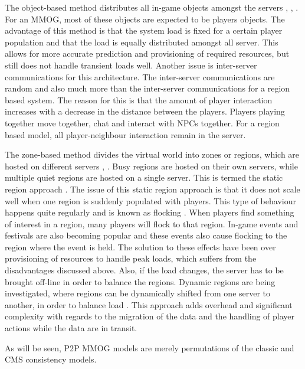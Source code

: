 \documentclass[journal,oneside,a4paper,onecolumn]{IEEEtran}
\begin{document}
The object-based method distributes all in-game objects amongst the servers \cite{object_based_consistency1}, \cite{object_based_consistency2}, \cite{object_based_consistency3}. For an MMOG, most of these objects are expected to be players objects. The advantage of this method is that the system load is fixed for a certain player population and that the load is equally distributed amongst all server. This allows for more accurate prediction and provisioning  of required resources, but still does not handle transient loads well. Another issue is inter-server communications for this architecture. The inter-server communications are random and also much more than the inter-server communications for a region based system. The reason for this is that the amount of player interaction increases with a decrease in the distance between the players. Players playing together move together, chat and interact with \acp{NPC} together. For a region based model, all player-neighbour interaction remain in the server.

The zone-based method divides the virtual world into zones or regions, which are hosted on different servers \cite{zone_based_stat}, \cite{zone_based_dyn}. Busy regions are hosted on their own servers, while multiple quiet regions are hosted on a single server. This is termed the static region approach \cite{zone_based_stat}. The issue of this static region approach is that it does not scale well when one region is suddenly populated with players. This type of behaviour happens quite regularly and is known as flocking \cite{flocking}. When players find something of interest in a region, many players will flock to that region. In-game events and festivals are also becoming popular and these events also cause flocking to the region where the event is held. The solution to these effects have been over provisioning of resources to handle peak loads, which suffers from the disadvantages discussed above. Also, if the load changes, the server has to be brought off-line in order to balance the regions. Dynamic regions are being investigated, where regions can be dynamically shifted from one server to another, in order to balance load \cite{zone_based_dyn}. This approach adds overhead and significant complexity with regards to the migration of the data and the handling of player actions while the data are in transit.

As will be seen, P2P MMOG models are merely permutations of the classic and \ac{CMS} consistency models.
\end{document}
